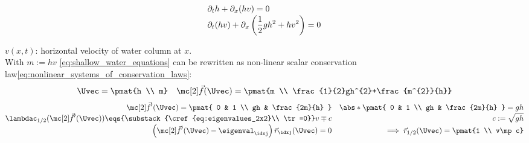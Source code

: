 \begin{examplebox}\nospacing
    \begin{example}\label{example:shallow_water_equations}\leavevmode\\
        \begin{minipage}{0.55\textwidth}
            \begin{align}
              &\partial_{t}h+\partial_{x}(hv)=0\nonumber \\[-1\jot]
              &\partial_{t}(hv)+\partial_{x}\left(\frac{1}{2}gh^{2}+hv^{2}\right)=0\label{eq:shallow_water_equations}
            \end{align}
        \end{minipage}\hfill
        \begin{minipage}[c]{0.38\textwidth}
            \begin{figure}[H]
                \centering{
                  \def\svgwidth{100pt}
                  \resizebox{\linewidth}{!}{}
                }
            \end{figure}
        \end{minipage}
        $v(x,t)$: horizontal velocity of water column at $x$.\\
        With $m:=hv$ \cref{eq:shallow_water_equations} can be rewritten as non-linear scalar conservation law\cref{eq:nonlinear_systems_of_conservation_laws}:
        \begin{align}
          \Uvec=\pmat{h \\ m}&&\fluxvec(\Uvec)=\pmat{m \\ \frac{1}{2}gh^{2}+\frac{m^{2}}{h}}
        \end{align}
        \begin{align*}
          \fluxvec'(\Uvec)=\pmat{
          0  & 1 \\
          gh & \frac{2m}{h}
          }&&\abs*{\pmat{
          0  & 1 \\
          gh & \frac{2m}{h}
               }}=gh \\[-1\jot]
          \lambdac_{1/2}(\fluxvec'(\Uvec))\eqs{\substack{\cref{eq:eigenvalues_2x2}\\ \tr=0}}v\mp c&&c:=\sqrt{gh}\\[-1\jot]
          \left(\fluxvec'(\Uvec)-\eigenval_{\idxj}\right)\vec{r}_{\idxj}(\Uvec)=0&&\implies\vec{r}_{1/2}(\Uvec)=\pmat{1 \\ v\mp c}
        \end{align*}

\end{example}
\end{examplebox}
